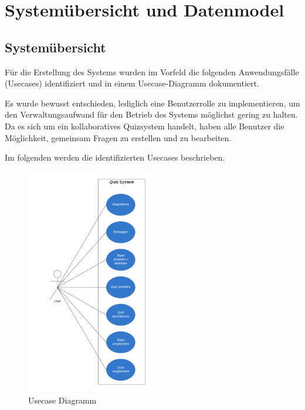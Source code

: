 \section{Systemübersicht und Datenmodel}

\subsection{Systemübersicht}

Für die Erstellung des Systems wurden im Vorfeld die folgenden Anwendungsfälle (Usecases) 
identifiziert und in einem Usecase-Diagramm dokumentiert.\newline


\noindent Es wurde bewusst entschieden, lediglich eine Benutzerrolle zu implementieren, um den 
Verwaltungsaufwand für den Betrieb des Systems möglichst gering zu halten. Da es sich um ein 
kollaboratives Quizsystem handelt, haben alle Benutzer die Möglichkeit, gemeinsam Fragen zu 
erstellen und zu bearbeiten.\newline

\noindent Im folgenden werden die identifizierten Usecases beschrieben.

\begin{figure}[H]
  \centering
  \includegraphics[width=0.5\textwidth]{img/Quiz System - Use Case Diagramm.png}
  \caption{Usecase Diagramm}
\end{figure}



